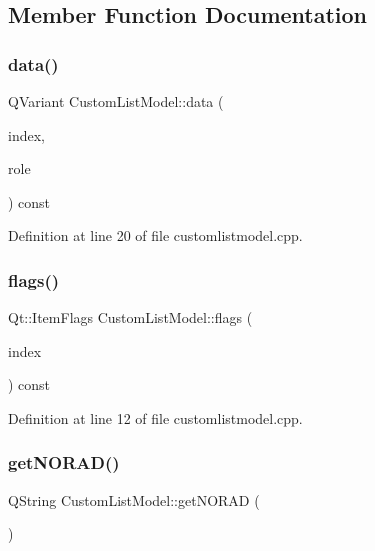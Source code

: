 \subsection{Member Function Documentation}
\mbox{\label{classCustomListModel_aeaf0b8e14950aa9e9c84fe955f5a19ec}} 
\subsubsection{\texorpdfstring{data()}{data()}}
{\footnotesize\ttfamily Q\+Variant Custom\+List\+Model\+::data (\begin{DoxyParamCaption}\item[{const Q\+Model\+Index \&}]{index,  }\item[{int}]{role }\end{DoxyParamCaption}) const}



Definition at line 20 of file customlistmodel.\+cpp.

\mbox{\label{classCustomListModel_aa134f39e9d4fbcba763d56dfd9b6a3f8}} 
\subsubsection{\texorpdfstring{flags()}{flags()}}
{\footnotesize\ttfamily Qt\+::\+Item\+Flags Custom\+List\+Model\+::flags (\begin{DoxyParamCaption}\item[{const Q\+Model\+Index \&}]{index }\end{DoxyParamCaption}) const}



Definition at line 12 of file customlistmodel.\+cpp.

\mbox{\label{classCustomListModel_a4d68ff8203e26c21b7f2f6d8b82c8f22}} 
\subsubsection{\texorpdfstring{get\+N\+O\+R\+A\+D()}{getNORAD()}}
{\footnotesize\ttfamily Q\+String Custom\+List\+Model\+::get\+N\+O\+R\+AD (\begin{DoxyParamCaption}{ }\end{DoxyParamCaption})}



